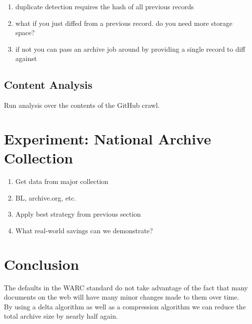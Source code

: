 \documentclass[11pt]{article}
\begin{document}


\begin{enumerate}
\item duplicate detection requires the hash of all previous records
\item what if you just diffed from a previous record. do you need more storage space?
\item if not you can pass an archive job around by providing a single record to diff against
\end{enumerate}


\subsection{Content Analysis}

Run analysis over the contents of the GitHub crawl.

\section{Experiment: National Archive Collection}

\begin{enumerate}
\item Get data from major collection
\item BL, archive.org, etc.
\item Apply best strategy from previous section
\item What real-world savings can we demonstrate?
\end{enumerate}

\section{Conclusion}

The defaults in the WARC standard do not take advantage of the fact that many documents on the web will have many minor changes made to them over time. By using a delta algorithm as well as a compression algorithm we can reduce the total archive size by nearly half again.
\end{document}

